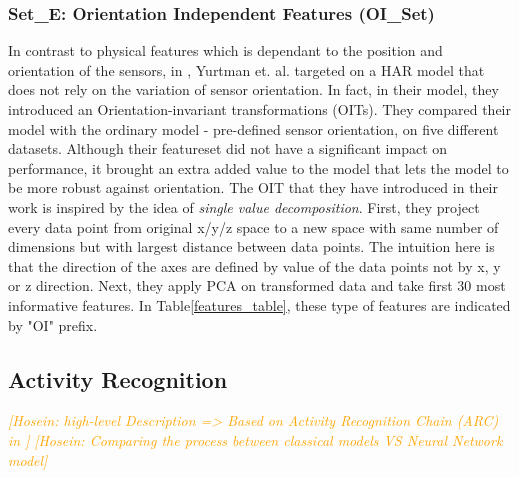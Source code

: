 \documentclass[journal,article,submit,moreauthors,pdftex]{Definitions/mdpi}
\newcommand{\hosein}[1]{\textcolor{orange}{{\it [Hosein: #1]}}}
\begin{document}
\subsubsection{Set\_E: Orientation Independent Features (OI\_Set)}
In contrast to physical features which is dependant to the position and orientation of the sensors, in \cite{yurtman2017activity}, Yurtman et. al. targeted on a HAR model that does not rely on the variation of sensor orientation. In fact, in their model, they introduced an Orientation-invariant transformations (OITs). They compared their model with the ordinary model - pre-defined sensor orientation, on five different datasets. Although their featureset did not have a significant impact on performance, it brought an extra added value to the model that lets the model to be more robust against orientation. The OIT that they have introduced in their work is inspired by the idea of \textit{single value decomposition}\cite{moon2000mathematical}. First, they project every data point from original x/y/z space to a new space with same number of dimensions but with largest distance between data points. The intuition here is that the direction of the axes are defined by value of the data points not by x, y or z direction. Next, they apply PCA on transformed data and take first 30 most informative features. In Table\ref{features_table}, these type of features  are indicated by "OI" prefix.


\subsection{Activity Recognition}
\hosein{high-level Description => Based on Activity Recognition Chain (ARC) in \cite{bulling2014tutorial}}
\hosein{Comparing the process between classical models VS Neural Network model}
\end{document}
